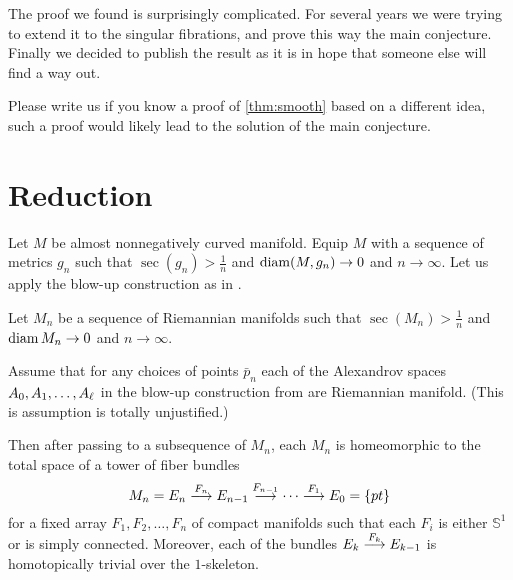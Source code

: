 \documentclass{amsart}
\begin{document}
The proof we found is surprisingly complicated.
For several years we were trying to extend it to the singular fibrations, and prove this way the main conjecture.
Finally we decided to publish the result as it is in hope that someone else will find a way out.

Please write us if you know a proof of \ref{thm:smooth} based on a different idea,
such a proof would likely lead to the solution of the main conjecture.

\section{Reduction}

Let $M$ be almost nonnegatively curved manifold.
Equip $M$ with a sequence of metrics $g_n$ such that $\sec(g_n)>\tfrac1n$ and $\operatorname{\rm diam} (M,g_n)\to 0$ and $n\to\infty$.
Let us apply the blow-up construction as in \cite[Subsection 4.3]{KPT}.

\begin{thm}
Let $M_n$ be a sequence of Riemannian manifolds such that $\sec(M_n)>\tfrac1n$ and $\operatorname{\rm diam} M_n\to 0$ and $n\to\infty$.

Assume that for any choices of points $\bar p_n$ each of the Alexandrov spaces $A_0,A_1,\z\dots,A_\ell$ in the blow-up construction from \cite[Subsection 4.3]{KPT} are Riemannian manifold.
(This is assumption is totally unjustified.)

Then after passing to a subsequence of $M_n$,
each $M_n$ is homeomorphic to the total space of a tower of fiber bundles
$$M_n=E_n\buildrel {F_n}\over \longrightarrow E_{n-1}\buildrel {F_{n-1}}\over\longrightarrow\dots\buildrel {F_1}\over\longrightarrow E_0=\{pt\}$$
for a fixed array $F_1,F_2,\dots,F_n$  of compact manifolds 
such that each $F_i$ is either $\mathbb{S}^{1}$ or is simply connected.
Moreover, each of the bundles $E_k\buildrel {F_k}\over \longrightarrow E_{k-1}$ is homotopically trivial over the $1$-skeleton.  
\end{thm}
\end{document}
